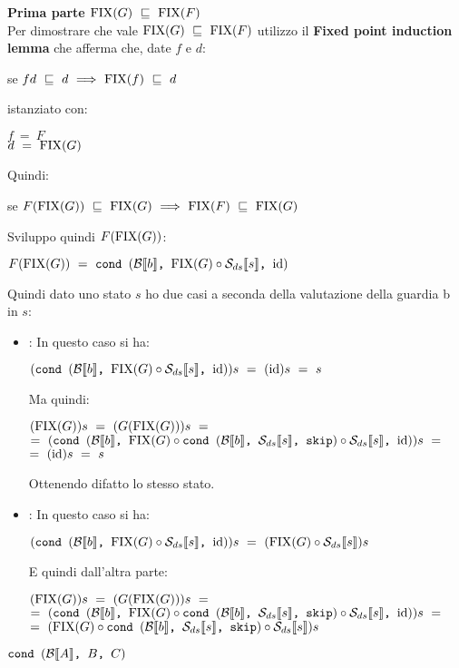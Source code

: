 {	\textbf{Prima parte $\fixp{G}~\mineq~\fixp{F}$}\\
	Per dimostrare che vale $\fixp{G}~\mineq~\fixp{F}$ utilizzo il
	\textbf{Fixed point induction lemma} che afferma che, date $f$ e $d$:
	\begin{center}
	se $fd~\mineq~d~\Longrightarrow~\fixp{f}~\mineq~d$
	\end{center}
	istanziato con:
	\begin{center}
	$f~=~F$ \\
	$d~=~\fixp{G}$
	\end{center}
	Quindi:
	\begin{center}
	se $F(\fixp{G})~\mineq~\fixp{G}~\Longrightarrow~\fixp{F}~\mineq~\fixp{G}$
	\end{center}
	Sviluppo quindi $F(\fixp{G})$:
	\begin{center}
	$F(\fixp{G})~=~\cond{b}{\fixp{G} \circ \Sds{}}{\idDS{}}$
	\end{center}
	Quindi dato uno stato $s$ ho due casi a seconda della valutazione della guardia b in $s$:
	\begin{itemize}
		\item {}: In questo caso si ha:
		\begin{center}
		$(\cond{b}{\fixp{G}\circ\Sds{}}{\idDS{}})s~=~(\idDS{})s~=~s$
		\end{center}
		Ma quindi:
		\begin{center}
		$(\fixp{G})s~=~(G(\fixp{G}))s~=$\\
		$=~(\cond{b}{\fixp{G} \circ{} \cond{b}{\Sds{}}{\skipistr} \circ{} \Sds{}}{\idDS})s~=$\\$=~(\idDS{})s~=~s$
		\end{center}
		Ottenendo difatto lo stesso stato.

		\item {}: In questo caso si ha:
		\begin{center}
		$(\cond{b}{\fixp{G}\circ\Sds{}}{\idDS{}})s~=~(\fixp{G}\circ\Sds{})s$
		\end{center}
		E quindi dall'altra parte:
		\begin{center}
		$(\fixp{G})s~=~(G(\fixp{G}))s~=$\\
		$=~(\cond{b}{\fixp{G} \circ{} \cond{b}{\Sds{}}{\skipistr} \circ{} \Sds{}}{\idDS})s~=$\\$=~(\fixp{G} \circ{} \cond{b}{\Sds{}}{\skipistr} \circ{} \Sds{})s$
		\end{center}
		
	\end{itemize}
	\FPIL{}
	\idDS{}
	\undefDS{}
	$\cond{A}{B}{C}$
}
